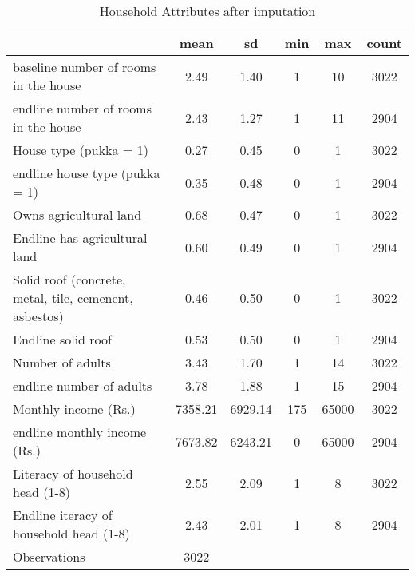 \begin{table}[htbp]\centering
\def\sym#1{\ifmmode^{#1}\else\(^{#1}\)\fi}
\caption{Household Attributes after imputation\label {tab1}}
\begin{tabular}{l*{1}{ccccc}}
\toprule
                    &        mean&          sd&         min&         max&       count\\
\midrule
baseline number of rooms in the house&        2.49&        1.40&           1&          10&        3022\\
endline number of rooms in the house&        2.43&        1.27&           1&          11&        2904\\
House type (pukka = 1)&        0.27&        0.45&           0&           1&        3022\\
endline house type (pukka = 1)&        0.35&        0.48&           0&           1&        2904\\
Owns agricultural land&        0.68&        0.47&           0&           1&        3022\\
Endline has agricultural land&        0.60&        0.49&           0&           1&        2904\\
Solid roof (concrete, metal, tile, cemenent, asbestos)&        0.46&        0.50&           0&           1&        3022\\
Endline solid roof  &        0.53&        0.50&           0&           1&        2904\\
Number of adults    &        3.43&        1.70&           1&          14&        3022\\
endline number of adults&        3.78&        1.88&           1&          15&        2904\\
Monthly income (Rs.)&     7358.21&     6929.14&         175&       65000&        3022\\
endline monthly income (Rs.)&     7673.82&     6243.21&           0&       65000&        2904\\
Literacy of household head (1-8)&        2.55&        2.09&           1&           8&        3022\\
Endline iteracy of household head (1-8)&        2.43&        2.01&           1&           8&        2904\\
\midrule
Observations        &        3022&            &            &            &            \\
\bottomrule
\end{tabular}
\end{table}
